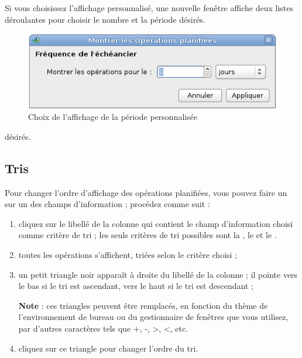 \ifIllustration
\else
{}
\fi

Si vous choisissez l'affichage personnalisé, une nouvelle fenêtre affiche deux listes déroulantes pour choisir le nombre et la période \ifIllustration désirés.

\begin{figure}[htbp]
\begin{center}
\includegraphics[scale=0.5]{image/screenshot/planned_transactions_display_custom}
\end{center}
\caption{Choix de l'affichage de la période personnalisée}
\label{planned-transactions-display-custom-img}
\end{figure}
\else désirés.
\fi

\ifIllustration
\else
\newpage
\fi


\subsection{Tris\label{plannedtransactions-list-sorts}}

Pour changer l'ordre d'affichage des opérations planifiées, vous pouvez faire un  sur un des champs d'information ; procédez comme suit :

\begin{enumerate}
	  \item cliquez sur le libellé de la colonne qui contient le champ d'information choisi comme critère de \gls{tri} ; les seuls critères de tri possibles sont la , le  et le .
	  \item toutes les opérations s'affichent, triées selon le critère choisi ;
	  \item un petit triangle noir apparaît à droite du libellé de la colonne ; il pointe vers le bas si le tri est ascendant, vers le haut si le tri est descendant ;

\textbf{Note} : ces triangles peuvent être remplacés, en fonction du thème de l'environnement de bureau ou du gestionnaire de fenêtres que vous utilisez, par d'autres caractères tels que +, -, >, <, etc.
	  \item cliquez sur ce triangle pour changer l'ordre du tri.
\end{enumerate}


